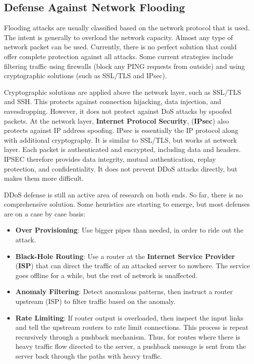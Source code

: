 \documentclass[11pt]{article}
\theoremstyle{plain} %
\theoremstyle{definition}
\theoremstyle{example}
\theoremstyle{remark}
\begin{document}
\subsection{Defense Against Network Flooding}

Flooding attacks are usually classified based on the network protocol that is used. The intent is generally to overload the network capacity. Almost any type of network packet can be used. Currently, there is no perfect solution that could offer complete protection against all attacks. Some current strategies include filtering traffic using firewalls (block any PING requests from outside) and using cryptographic solutions (such as SSL/TLS and IPsec). 

Cryptographic solutions are applied above the network layer, such as SSL/TLS and SSH. This protects against connection hijacking, data injection, and eavesdropping. However, it does not protect against DoS attacks by spoofed packets. At the network layer, \textbf{Internet Protocol Security}, (\textbf{IPsec})
also protects against IP address spoofing. IPsec is essentially the IP protocol along with additional cryptography. It is similar to SSL/TLS, but works at network layer. Each packet is authenticated and encrypted, including data and headers. IPSEC therefore provides data integrity, mutual authentication, replay protection, and confidentiality. It does not prevent DDoS attacks directly, but makes them more difficult. 

DDoS defense is still an active area of research on both ends. So far, there is no comprehensive solution. Some heuristics are starting to emerge, but most defenses are on a case by case basis:
\begin{itemize}
	\item \textbf{Over Provisioning}: Use bigger pipes than needed, in order to ride out the attack. 
	\item \textbf{Black-Hole Routing}: Use a router at the \textbf{Internet Service Provider} (\textbf{ISP}) that can direct the traffic of an attacked server to nowhere. The service goes offline for a while, but the rest of network is unaffected. 
	\item \textbf{Anomaly Filtering}: Detect anomalous patterns, then instruct a router upstream (ISP) to filter traffic based on the anomaly. 
	\item \textbf{Rate Limiting}: If router output is overloaded, then inspect the input links and tell the upstream routers to rate limit connections. This process is repeat recursively through a pushback mechanism. Thus, for routes where there is heavy traffic flow directed to the server, a pushback message is sent from the server back through the paths with heavy traffic. 
\end{itemize}
\end{document}

